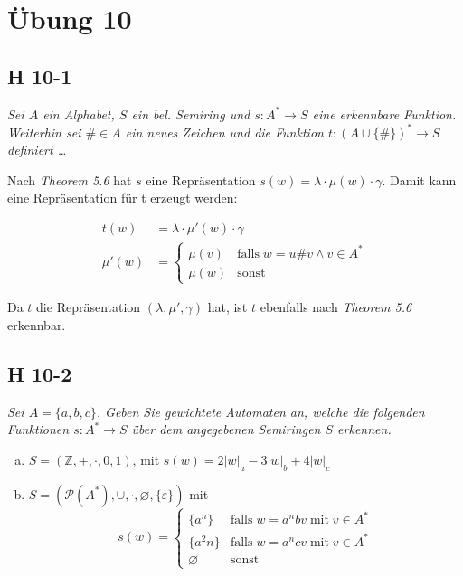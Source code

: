 \documentclass{scrartcl}
\begin{document}
\section{Übung 10}

\subsection{H 10-1}

\textsl{Sei $A$ ein Alphabet, $S$ ein bel. Semiring und $s: A^* \rightarrow S$ eine erkennbare Funktion. Weiterhin sei $\# \in A$ ein neues Zeichen und die Funktion $t: (A \cup \{\#\})^* \rightarrow S$ definiert \ldots}

Nach \emph{Theorem 5.6} hat $s$ eine Repräsentation $s(w) = \lambda\cdot\mu(w)\cdot\gamma$. Damit kann eine Repräsentation für t erzeugt werden:

\begin{align*}
    t(w) &=  \lambda\cdot\mu'(w)\cdot\gamma\\
    \mu'(w) &= \begin{cases}
        \mu(v)  &\text{falls}\; w = u\#v \land v \in A^*\\
        \mu(w)  &\text{sonst}
    \end{cases}
\end{align*}

Da $t$ die Repräsentation $(\lambda, \mu', \gamma)$ hat, ist $t$ ebenfalls nach \emph{Theorem 5.6} erkennbar.

\subsection{H 10-2}

\textsl{Sei $A = \{a,b,c\}$. Geben Sie gewichtete Automaten an, welche die folgenden Funktionen $s: A^* \rightarrow S$ über dem angegebenen Semiringen $S$ erkennen.}

\begin{enumerate}[(a)]
    \item $S = (\mathbb{Z}, +, \cdot, 0, 1)$, mit $s(w) = 2|w|_a -3|w|_b + 4|w|_c$

    \item $S = (\mathcal{P}(A^*), \cup, \cdot, \varnothing, \{\varepsilon\})$ mit
    \begin{equation*}
        s(w) = \begin{cases}
            \{a^n\}     &\text{falls}\;w = a^nbv\;\text{mit}\;v \in A^*\\
            \{a^2n\}    &\text{falls}\;w=a^ncv\;\text{mit}\;v \in A^*\\
            \varnothing &\text{sonst}
        \end{cases}
    \end{equation*}
\end{enumerate}
\end{document}
